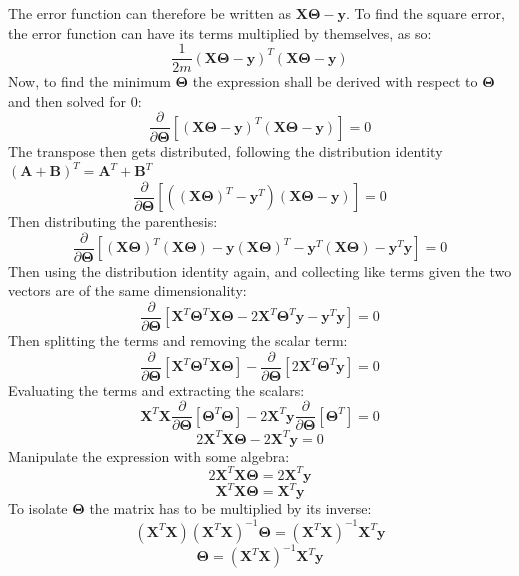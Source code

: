 \documentclass[a4paper,12pt]{article}
\begin{document}
The error function can therefore be written as \(\boldsymbol{X\Theta} - \boldsymbol{y}\). To find the square error, the error function can have its terms multiplied by themselves, as so:
\[\frac{1}{2m}(\boldsymbol{X\Theta} - \boldsymbol{y})^T(\boldsymbol{X\Theta} - \boldsymbol{y})\]
Now, to find the minimum \(\boldsymbol{\Theta}\) the expression shall be derived with respect to \(\boldsymbol{\Theta}\) and then solved for \(0\):
\[\frac{\partial}{\partial\boldsymbol{\Theta}}[(\boldsymbol{X\Theta} - \boldsymbol{y})^T(\boldsymbol{X\Theta} - \boldsymbol{y})] = 0\]
The transpose then gets distributed, following the distribution identity \((\boldsymbol{A} + \boldsymbol{B})^T = \boldsymbol{A}^T + \boldsymbol{B}^T\)
\[\frac{\partial}{\partial\boldsymbol{\Theta}}[((\boldsymbol{X\Theta})^T - \boldsymbol{y}^T)(\boldsymbol{X\Theta} - \boldsymbol{y})] = 0\]
Then distributing the parenthesis:
\[\frac{\partial}{\partial\boldsymbol{\Theta}}[(\boldsymbol{X\Theta})^T(\boldsymbol{X\Theta}) - \boldsymbol{y}(\boldsymbol{X\Theta})^T - \boldsymbol{y}^T(\boldsymbol{X\Theta}) - \boldsymbol{y}^T\boldsymbol{y}] = 0\]
Then using the distribution identity again, and collecting like terms given the two vectors are of the same dimensionality:
\[\frac{\partial}{\partial\boldsymbol{\Theta}}[\boldsymbol{X}^T\boldsymbol{\Theta}^T\boldsymbol{X\Theta} - 2\boldsymbol{X}^T\boldsymbol{\Theta}^T\boldsymbol{y} - \boldsymbol{y}^T\boldsymbol{y}] = 0\]
Then splitting the terms and removing the scalar term: 
\[\frac{\partial}{\partial\boldsymbol{\Theta}}[\boldsymbol{X}^T\boldsymbol{\Theta}^T\boldsymbol{X\Theta}] - \frac{\partial}{\partial\boldsymbol{\Theta}}[2\boldsymbol{X}^T\boldsymbol{\Theta}^T\boldsymbol{y}] = 0\]
Evaluating the terms and extracting the scalars:
\[\boldsymbol{X}^T\boldsymbol{X}\frac{\partial}{\partial\boldsymbol{\Theta}}[\boldsymbol{\Theta}^T\boldsymbol{\Theta}] - 2\boldsymbol{X}^T\boldsymbol{y}\frac{\partial}{\partial\boldsymbol{\Theta}}[\boldsymbol{\Theta}^T] = 0 \]
\[2\boldsymbol{X}^T\boldsymbol{X\Theta} - 2\boldsymbol{X}^T\boldsymbol{y} = 0\]
Manipulate the expression with some algebra:
\[2\boldsymbol{X}^T\boldsymbol{X\Theta} = 2\boldsymbol{X}^T\boldsymbol{y}\]
\[\boldsymbol{X}^T\boldsymbol{X\Theta} = \boldsymbol{X}^T\boldsymbol{y}\]
To isolate $\boldsymbol{\Theta}$ the matrix has to be multiplied by its inverse:
\[(\boldsymbol{X}^T\boldsymbol{X})(\boldsymbol{X}^T\boldsymbol{X})^{-1}\boldsymbol{\Theta} = (\boldsymbol{X}^T\boldsymbol{X})^{-1}\boldsymbol{X}^T\boldsymbol{y}\]
\[\boldsymbol{\Theta} = (\boldsymbol{X}^T\boldsymbol{X})^{-1}\boldsymbol{X}^T\boldsymbol{y}\]
\end{document}
